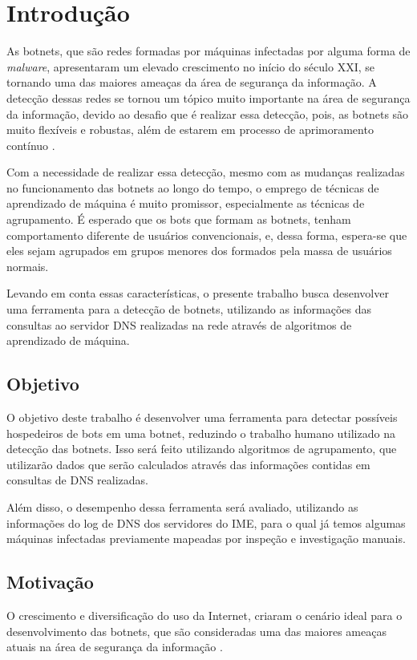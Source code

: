 \chapter{Introdução}
As botnets, que são redes formadas por máquinas infectadas por alguma forma de \textit{malware}, apresentaram um elevado crescimento no início do século XXI, se tornando uma das maiores ameaças da área de segurança da informação. A detecção dessas redes se tornou um tópico muito importante na área de segurança da informação, devido ao desafio que é realizar essa detecção, pois, as botnets são muito flexíveis e robustas, além de estarem em processo de aprimoramento contínuo \citep{bu2010new}.

Com a necessidade de realizar essa detecção, mesmo com as mudanças realizadas no funcionamento das botnets ao longo do tempo, o emprego de técnicas de aprendizado de máquina é muito promissor, especialmente as técnicas de agrupamento. É esperado que os bots que formam as botnets, tenham comportamento diferente de usuários convencionais, e, dessa forma, espera-se que eles sejam agrupados em grupos menores dos formados pela massa de usuários normais.

Levando em conta essas características, o presente trabalho busca desenvolver uma ferramenta para a detecção de botnets, utilizando as informações das consultas ao servidor DNS realizadas na rede através de algoritmos de aprendizado de máquina.

\section{Objetivo}
O objetivo deste trabalho é desenvolver uma ferramenta para detectar possíveis hospedeiros de bots em uma botnet, reduzindo o trabalho humano utilizado na detecção das botnets. Isso será feito utilizando algoritmos de agrupamento, que utilizarão dados que serão calculados através das informações contidas em consultas de DNS realizadas. 

Além disso, o desempenho dessa ferramenta será avaliado, utilizando as informações do log de DNS dos servidores do IME, para o qual já temos algumas máquinas infectadas previamente mapeadas por inspeção e investigação manuais.

\section{Motivação}
O crescimento e diversificação do uso da Internet, criaram o cenário ideal para o desenvolvimento das botnets, que são consideradas uma das maiores ameaças atuais na área de segurança da informação \citep{ji2008botnet}.

